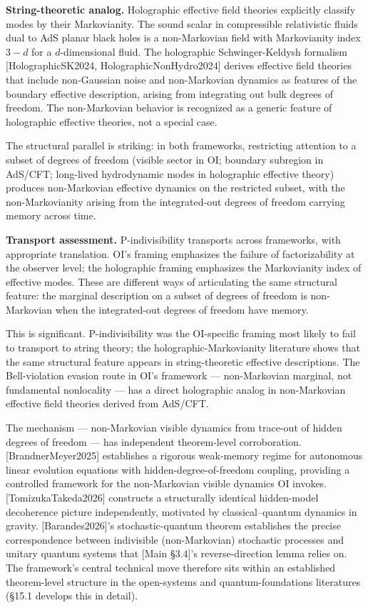 \documentclass[
]{article}
\begin{document}
\textbf{String-theoretic analog.} Holographic effective field theories
explicitly classify modes by their Markovianity. The sound scalar in
compressible relativistic fluids dual to AdS planar black holes is a
non-Markovian field with Markovianity index \(3 - d\) for a
\(d\)-dimensional fluid. The holographic Schwinger-Keldysh formalism
{[}HolographicSK2024, HolographicNonHydro2024{]} derives effective field
theories that include non-Gaussian noise and non-Markovian dynamics as
features of the boundary effective description, arising from integrating
out bulk degrees of freedom. The non-Markovian behavior is recognized as
a generic feature of holographic effective theories, not a special case.

The structural parallel is striking: in both frameworks, restricting
attention to a subset of degrees of freedom (visible sector in OI;
boundary subregion in AdS/CFT; long-lived hydrodynamic modes in
holographic effective theory) produces non-Markovian effective dynamics
on the restricted subset, with the non-Markovianity arising from the
integrated-out degrees of freedom carrying memory across time.

\textbf{Transport assessment.} P-indivisibility transports across
frameworks, with appropriate translation. OI's framing emphasizes the
failure of factorizability at the observer level; the holographic
framing emphasizes the Markovianity index of effective modes. These are
different ways of articulating the same structural feature: the marginal
description on a subset of degrees of freedom is non-Markovian when the
integrated-out degrees of freedom have memory.

This is significant. P-indivisibility was the OI-specific framing most
likely to fail to transport to string theory; the
holographic-Markovianity literature shows that the same structural
feature appears in string-theoretic effective descriptions. The
Bell-violation evasion route in OI's framework --- non-Markovian
marginal, not fundamental nonlocality --- has a direct holographic
analog in non-Markovian effective field theories derived from AdS/CFT.

The mechanism --- non-Markovian visible dynamics from trace-out of
hidden degrees of freedom --- has independent theorem-level
corroboration. {[}BrandnerMeyer2025{]} establishes a rigorous
weak-memory regime for autonomous linear evolution equations with
hidden-degree-of-freedom coupling, providing a controlled framework for
the non-Markovian visible dynamics OI invokes. {[}TomizukaTakeda2026{]}
constructs a structurally identical hidden-model decoherence picture
independently, motivated by classical--quantum dynamics in gravity.
{[}Barandes2026{]}'s stochastic-quantum theorem establishes the precise
correspondence between indivisible (non-Markovian) stochastic processes
and unitary quantum systems that {[}Main §3.4{]}'s reverse-direction
lemma relies on. The framework's central technical move therefore sits
within an established theorem-level structure in the open-systems and
quantum-foundations literatures (§15.1 develops this in detail).
\end{document}
